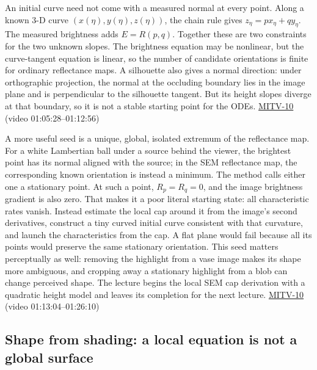 An initial curve need not come with a measured normal at every point. Along a known 3-D curve \((x(\eta),y(\eta),z(\eta))\), the chain rule gives \(z_\eta=p x_\eta+q y_\eta\). The measured brightness adds \(E=R(p,q)\). Together these are two constraints for the two unknown slopes. The brightness equation may be nonlinear, but the curve-tangent equation is linear, so the number of candidate orientations is finite for ordinary reflectance maps. A silhouette also gives a normal direction: under orthographic projection, the normal at the occluding boundary lies in the image plane and is perpendicular to the silhouette tangent. But its height slopes diverge at that boundary, so it is not a stable starting point for the ODEs. \hyperref[04-visual-computing-ii-ch036-mitv-10---characteristic-strip-expansion-shape-from-shading-iterative-solutions]{MITV-10} (video 01:05:28--01:12:56)

A more useful seed is a unique, global, isolated extremum of the reflectance map. For a white Lambertian ball under a source behind the viewer, the brightest point has its normal aligned with the source; in the SEM reflectance map, the corresponding known orientation is instead a minimum. The method calls either one a stationary point. At such a point, \(R_p=R_q=0\), and the image brightness gradient is also zero. That makes it a poor literal starting state: all characteristic rates vanish. Instead estimate the local cap around it from the image's second derivatives, construct a tiny curved initial curve consistent with that curvature, and launch the characteristics from the cap. A flat plane would fail because all its points would preserve the same stationary orientation. This seed matters perceptually as well: removing the highlight from a vase image makes its shape more ambiguous, and cropping away a stationary highlight from a blob can change perceived shape. The lecture begins the local SEM cap derivation with a quadratic height model and leaves its completion for the next lecture. \hyperref[04-visual-computing-ii-ch036-mitv-10---characteristic-strip-expansion-shape-from-shading-iterative-solutions]{MITV-10} (video 01:13:04--01:26:10)

\subsection{Shape from shading: a local equation is not a global surface}\label{04-visual-computing-ii-ch032-shape-from-shading-a-local-equation-is-not-a-global-surface}

\hypertarget{04-visual-computing-ii-ch032-shape-from-shading-a-local-equation-is-not-a-global-surface}{}

